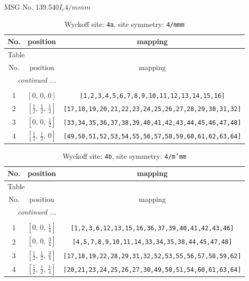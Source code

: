 \documentclass[fleqn,8pt]{jsarticle}
\begin{document}
\setcounter{MaxMatrixCols}{32}

\renewcommand{\tablename}{Table~}
\renewcommand{\figurename}{Figure~}
\begin{center}
\LARGE
MSG No. 139.540\quad$I_{c}4/mmm$
\end{center}
\renewcommand{\arraystretch}{1.2}
\begin{longtable}{ccc}
\caption{Wyckoff site: {\tt 4a}, site symmetry: {\tt 4/mmm}}
 \\
 \hline \hline
No. & position & mapping \\ \hline \endfirsthead

\multicolumn{2}{l}{\tablename\ \thetable{}} \\
 \hline \hline
No. & position & mapping \\ \hline \endhead

 \hline \hline
\multicolumn{2}{r}{\footnotesize\it continued ...} \\ \endfoot

 \hline \hline
\multicolumn{2}{r}{} \\ \endlastfoot

1 & $\left[ 0,\, 0,\, 0 \right]$ & {\tt [1,2,3,4,5,6,7,8,9,10,11,12,13,14,15,16]} \\ \hline
2 & $\left[ \frac{1}{2},\, \frac{1}{2},\, \frac{1}{2} \right]$ & {\tt [17,18,19,20,21,22,23,24,25,26,27,28,29,30,31,32]} \\ \hline
3 & $\left[ 0,\, 0,\, \frac{1}{2} \right]$ & {\tt [33,34,35,36,37,38,39,40,41,42,43,44,45,46,47,48]} \\ \hline
4 & $\left[ \frac{1}{2},\, \frac{1}{2},\, 0 \right]$ & {\tt [49,50,51,52,53,54,55,56,57,58,59,60,61,62,63,64]} \\
\end{longtable}
\renewcommand{\arraystretch}{1.2}
\begin{longtable}{ccc}
\caption{Wyckoff site: {\tt 4b}, site symmetry: {\tt 4/m'mm}}
 \\
 \hline \hline
No. & position & mapping \\ \hline \endfirsthead

\multicolumn{2}{l}{\tablename\ \thetable{}} \\
 \hline \hline
No. & position & mapping \\ \hline \endhead

 \hline \hline
\multicolumn{2}{r}{\footnotesize\it continued ...} \\ \endfoot

 \hline \hline
\multicolumn{2}{r}{} \\ \endlastfoot

1 & $\left[ 0,\, 0,\, \frac{1}{4} \right]$ & {\tt [1,2,3,6,12,13,15,16,36,37,39,40,41,42,43,46]} \\ \hline
2 & $\left[ 0,\, 0,\, \frac{3}{4} \right]$ & {\tt [4,5,7,8,9,10,11,14,33,34,35,38,44,45,47,48]} \\ \hline
3 & $\left[ \frac{1}{2},\, \frac{1}{2},\, \frac{3}{4} \right]$ & {\tt [17,18,19,22,28,29,31,32,52,53,55,56,57,58,59,62]} \\ \hline
4 & $\left[ \frac{1}{2},\, \frac{1}{2},\, \frac{1}{4} \right]$ & {\tt [20,21,23,24,25,26,27,30,49,50,51,54,60,61,63,64]} \\
\end{longtable}
\end{document}
